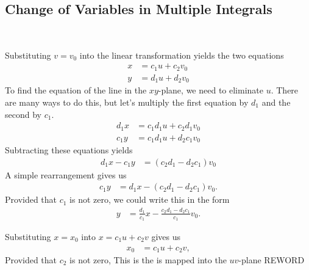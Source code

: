 \subsection{Change of Variables in Multiple Integrals}

\BEN
\item %
 \\
\BEN
\item Substituting $v = v_0$ into the linear transformation yields the two equations
\begin{align*}
  x &= c_1u + c_2v_0 \\ 
  y &= d_1u + d_2v_0
\end{align*}
To find the equation of the line in the $xy$-plane, we need to eliminate $u$. There are many ways to do this, but let's multiply the first equation by $d_1$ and the second by $c_1$.
\begin{align*}
  d_1x &= c_1d_1u + c_2d_1v_0 \\ 
  c_1y &= c_1d_1u + d_2c_1v_0
\end{align*}
Subtracting these equations yields
\begin{align*}
  d_1x -  c_1y &=  (c_2d_1 -  d_2c_1)v_0 
\end{align*}
A simple rearrangement gives us
\begin{align*}
  c_1y &= d_1x - (c_2d_1 -  d_2c_1)v_0 .
\end{align*}
Provided that $c_1$ is not zero, we could write this in the form
\begin{align*}
  y &= \frac{d_1}{c_1}x - \frac{c_2d_1 -  d_2c_1}{c_1}v_0 .
\end{align*}
\item 
Substituting $x=x_0$ into $x =c_1u + c_2v$ gives us 
\begin{align*}
  x_0 &= c_1u + c_2v,
\end{align*}
Provided that $c_2$ is not zero, 
This is the is mapped into the $uv$-plane REWORD
\EEN

